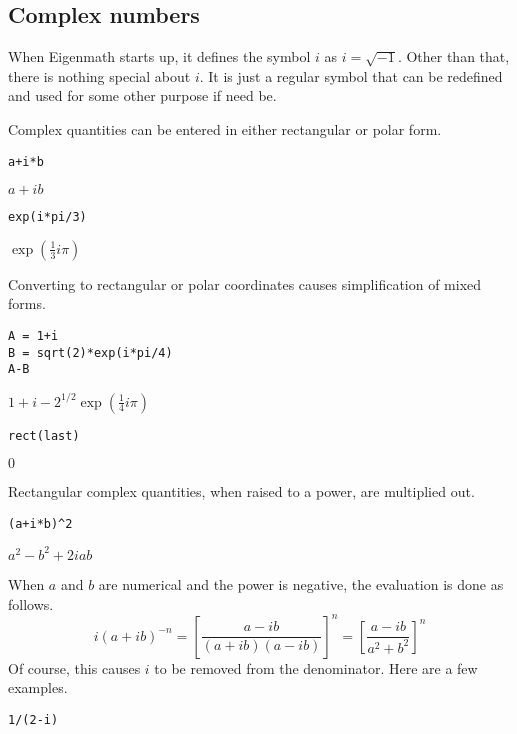 \subsection{Complex numbers}
When Eigenmath starts up, it defines the symbol $i$ as $i=\sqrt{-1}$.
Other than that, there is nothing special about $i$.
It is just a regular symbol that can be redefined and used for some other purpose if need be.

Complex quantities can be entered in either rectangular or polar form.

\begin{Verbatim}[formatcom=\color{blue},samepage=true]
a+i*b
\end{Verbatim}

$\displaystyle a+ib$

\begin{Verbatim}[formatcom=\color{blue},samepage=true]
exp(i*pi/3)
\end{Verbatim}

$\displaystyle \exp(\frac{1}{3}i\pi)$

Converting to rectangular or polar coordinates causes
simplification of mixed forms.

\begin{Verbatim}[formatcom=\color{blue},samepage=true]
A = 1+i
B = sqrt(2)*exp(i*pi/4)
A-B
\end{Verbatim}

$1+i-2^{1/2}\exp(\frac{1}{4}i\pi)$

\begin{Verbatim}[formatcom=\color{blue},samepage=true]
rect(last)
\end{Verbatim}

$\displaystyle 0$

Rectangular complex quantities, when raised to a power, are multiplied out.

\begin{Verbatim}[formatcom=\color{blue},samepage=true]
(a+i*b)^2
\end{Verbatim}

$\displaystyle a^2-b^2+2iab$

When $a$ and $b$ are numerical and the power is negative, the evaluation is done as follows.
$$i
(a+ib)^{-n}
=\left[\frac{a-ib}{(a+ib)(a-ib)}\right]^n=
\left[\frac{a-ib}{a^2+b^2}\right]^n$$
Of course, this causes $i$ to be removed from the denominator.
Here are a few examples.

\begin{Verbatim}[formatcom=\color{blue},samepage=true]
1/(2-i)
\end{Verbatim}

